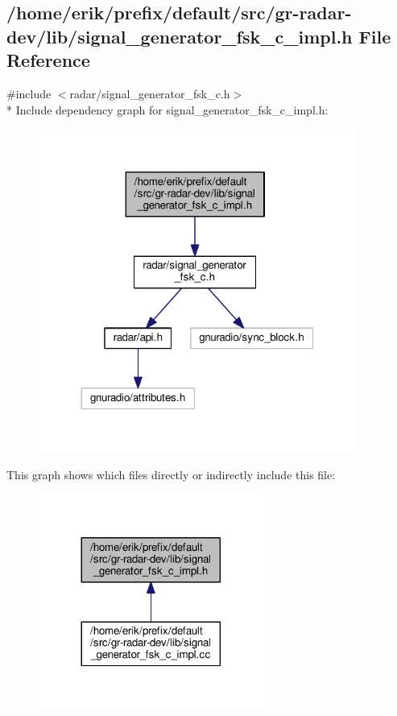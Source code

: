 \subsection{/home/erik/prefix/default/src/gr-\/radar-\/dev/lib/signal\+\_\+generator\+\_\+fsk\+\_\+c\+\_\+impl.h File Reference}
\label{signal__generator__fsk__c__impl_8h}
{\ttfamily \#include $<$radar/signal\+\_\+generator\+\_\+fsk\+\_\+c.\+h$>$}\\*
Include dependency graph for signal\+\_\+generator\+\_\+fsk\+\_\+c\+\_\+impl.\+h\+:
\nopagebreak
\begin{figure}[H]
\begin{center}
\leavevmode
\includegraphics[width=296pt]{d1/d14/signal__generator__fsk__c__impl_8h__incl}
\end{center}
\end{figure}
This graph shows which files directly or indirectly include this file\+:
\nopagebreak
\begin{figure}[H]
\begin{center}
\leavevmode
\includegraphics[width=209pt]{da/d88/signal__generator__fsk__c__impl_8h__dep__incl}
\end{center}
\end{figure}
